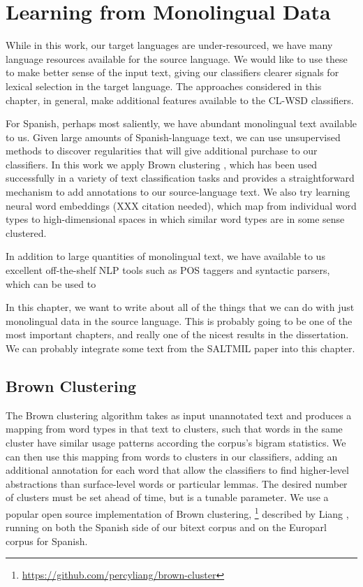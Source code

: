 \chapter{Learning from Monolingual Data}
\label{chap:monolingual}
While in this work, our target languages are under-resourced, we have many
language resources available for the source language. We would like to use
these to make better sense of the input text, giving our classifiers clearer
signals for lexical selection in the target language. The approaches considered
in this chapter, in general, make additional features available to the CL-WSD
classifiers.

For Spanish, perhaps most saliently, we have abundant monolingual text
available to us.
Given large amounts of Spanish-language text, we can use
unsupervised methods to discover regularities that will give additional
purchase to our classifiers.
In this work we apply Brown clustering
\cite{brown1992class}, which has been used successfully in a variety
of text classification tasks \cite{turian-ratinov-bengio:2010:ACL} and provides
a straightforward mechanism to add annotations to our source-language text.
We also try learning neural word embeddings (XXX citation needed), which map
from individual word types to high-dimensional spaces in which similar word
types are in some sense clustered. %


In addition to large quantities of monolingual text, we have available to us
excellent off-the-shelf NLP tools such as POS taggers and syntactic parsers,
which can be used to

In this chapter, we want to write about all of the things that we can do with
just monolingual data in the source language.
This is probably going to be one of the most important chapters, and really one
of the nicest results in the dissertation.
We can probably integrate some text from the SALTMIL paper into this chapter.


\section{Brown Clustering}
The Brown clustering algorithm takes as input unannotated text and produces a
mapping from word types in that text to clusters, such that words in the same
cluster have similar usage patterns according the corpus's bigram statistics.
We can then use this mapping from words to clusters in our classifiers, adding
an additional annotation for each word that allow the classifiers to find
higher-level abstractions than surface-level words or particular lemmas.
The desired number of clusters must be set ahead of time, but is a tunable
parameter.
We use a popular open source implementation of Brown clustering,
\footnote{\url{https://github.com/percyliang/brown-cluster}} described by
Liang \cite{Liang05semi-supervisedlearning}, running on both the Spanish
side of our bitext corpus and on the Europarl corpus \cite{europarl} for
Spanish.


